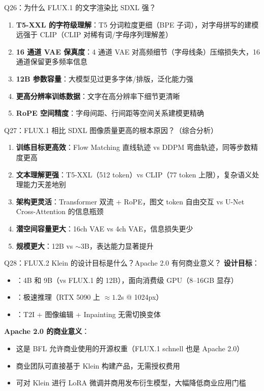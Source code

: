 \begin{conceptbox}{Q26：为什么 FLUX.1 的文字渲染比 SDXL 强？}
\begin{enumerate}
  \item \textbf{T5-XXL 的字符级理解}：T5 分词粒度更细（BPE 子词），对字母拼写的建模远强于 CLIP（CLIP 对稀有词/字母序列理解差）
  \item \textbf{16 通道 VAE 保真度}：4 通道 VAE 对高频细节（字母线条）压缩损失大，16 通道保留更多频率信息
  \item \textbf{12B 参数容量}：大模型见过更多字体/排版，泛化能力强
  \item \textbf{更高分辨率训练数据}：文字在高分辨率下细节更清晰
  \item \textbf{RoPE 空间精度}：字母间距、行间距等空间关系建模更精确
\end{enumerate}

\end{conceptbox}

\begin{conceptbox}{Q27：FLUX.1 相比 SDXL 图像质量更高的根本原因？（综合分析）}
\begin{enumerate}
  \item \textbf{训练目标更高效}：Flow Matching 直线轨迹 vs DDPM 弯曲轨迹，同等步数精度更高
  \item \textbf{文本理解更强}：T5-XXL（512 token）vs CLIP（77 token 上限），复杂语义处理能力天差地别
  \item \textbf{架构更灵活}：Transformer 双流 + RoPE，图文 token 自由交互 vs U-Net Cross-Attention 的信息瓶颈
  \item \textbf{潜空间容量更大}：16ch VAE vs 4ch VAE，信息损失更少
  \item \textbf{规模更大}：12B vs $\sim$3B，表达能力显著提升
\end{enumerate}
\end{conceptbox}

\begin{conceptbox}{Q28：FLUX.2 Klein 的设计目标是什么？Apache 2.0 有何商业意义？}
\textbf{设计目标}：
\begin{itemize}
  \item {}：4B 和 9B（vs FLUX.1 的 12B），面向消费级 GPU（8--16GB 显存）
  \item {}：极速推理（RTX 5090 上 $\approx 1.2$s @ 1024px）
  \item {}：T2I + 图像编辑 + Inpainting 无需切换变体
\end{itemize}

\textbf{Apache 2.0 的商业意义}：
\begin{itemize}
  \item 这是 BFL 允许商业使用的开源权重（FLUX.1 schnell 也是 Apache 2.0）
  \item 商业团队可直接基于 Klein 构建产品，无需授权费用
  \item 可对 Klein 进行 LoRA 微调并商用发布衍生模型，大幅降低商业应用门槛
\end{itemize}
\end{conceptbox}


